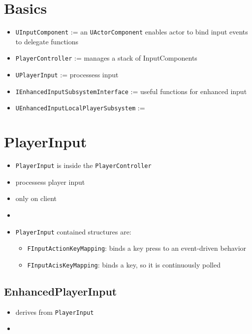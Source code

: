 \documentclass{scrbook}
\newcommand{\code}[1]{\colorbox{mygray}{\lstinline|#1|}}
\begin{document}
        \section{Basics}
            \begin{itemize}
                \item \code{UInputComponent} := an \code{UActorComponent} enables actor to bind input events to delegate functions
                \item \code{PlayerController} := manages a stack of InputComponents
                \item \code{UPlayerInput} := processess input
                \item \code{IEnhancedInputSubsystemInterface} := useful functions for enhanced input
                \item \code{UEnhancedInputLocalPlayerSubsystem} := 
            \end{itemize}

        \section{PlayerInput}
        \begin{itemize}
            \item \code{PlayerInput} is inside the \code{PlayerController}
            \item processess player input
            \item only on client
            \item 
            \item \code{PlayerInput} contained structures are:
            \begin{itemize}
                \item \code{FInputActionKeyMapping}: binds a key press to an event-driven behavior
                \item \code{FInputAcisKeyMapping}: binds a key, so it is continuously polled
            \end{itemize}
        \end{itemize}
            \subsection{EnhancedPlayerInput}
                \begin{itemize}
                    \item derives from \code{PlayerInput}
                    \item 
                \end{itemize}
        
\end{document}
